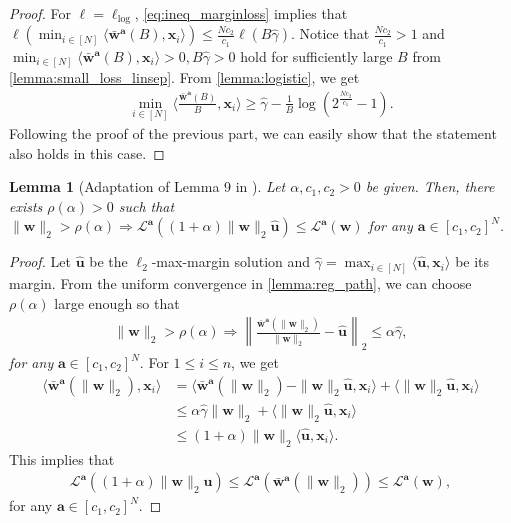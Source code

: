 \documentclass{article} %
\theoremstyle{plain}
\newtheorem{lemma}[theorem]{Lemma}
\theoremstyle{definition}
\theoremstyle{remark}
\def\bignorm#1{\left\lVert#1\right\rVert}
\newcommand{\Ls}{\mathcal{L}}
\def\ba{{\boldsymbol a}}
\def\bu{{\mathbf u}}
\def\bx{{\mathbf x}}
\def\bw{{\mathbf w}}
\begin{document}
\begin{proof}
    For $\ell=\ell_{\text{log}}$, \cref{eq:ineq_marginloss} implies that $\ell(\min_{i\in[N]}\langle \bar{\bw}^\ba(B), \bx_i \rangle) \leq \frac{Nc_2}{c_1}\ell(B\hat{\gamma})$. Notice that $\frac{Nc_2}{c_1}>1$ and $\min_{i\in[N]}\langle \bar{\bw}^\ba(B), \bx_i \rangle>0, B\hat{\gamma} >0$ hold for sufficiently large $B$ from \cref{lemma:small_loss_linsep}. From \cref{lemma:logistic}, we get
    \begin{align*}
        \min_{i \in [N]} \langle \frac{\bar{\bw}^\ba(B)}{B}, \bx_i \rangle \geq \hat{\gamma} - \frac{1}{B}\log (2^\frac{Nc_2}{c_1}-1).
    \end{align*}
    Following the proof of the previous part, we can easily show that the statement also holds in this case.
\end{proof}

\begin{lemma}[Adaptation of Lemma 9 in \citet{ji2020regularization}]\label{lemma:rho}
    Let $\alpha, c_1, c_2>0$ be given. Then, there exists $\rho(\alpha)>0$ such that $\|\bw\|_2 > \rho(\alpha) \Rightarrow \Ls^\ba((1+\alpha)\|\bw\|_2\hat{\bu}) \leq \Ls^\ba(\bw)$ for any $\ba \in [c_1, c_2]^N$.
\end{lemma}
\begin{proof}
    Let $\hat{\bu}$ be the $\ell_2$-max-margin solution and $\hat{\gamma}=\max_{i \in [N]}\langle \hat{\bu}, \bx_i \rangle$ be its margin. From the uniform convergence in \cref{lemma:reg_path}, we can choose $\rho(\alpha)$ large enough so that
    \begin{align*}
        \|\bw\|_2 > \rho(\alpha) \Rightarrow \bignorm{\frac{\bar{\bw}^\ba(\|\bw\|_2)}{\|\bw\|_2} - \hat{\bu}}_2 \leq \alpha \hat{\gamma},
    \end{align*}
    \textit{for any} $\ba \in [c_1, c_2]^N$. For $1 \leq i \leq n$, we get
    \begin{align*}
    \langle \bar{\mathbf{w}}^\ba(\|\mathbf{w}\|_2), \mathbf{x}_i \rangle 
    &= \langle \bar{\mathbf{w}}^\ba(\|\mathbf{w}\|_2) - \|\mathbf{w}\|_2\hat{\mathbf{u}}, \mathbf{x}_i \rangle + \langle \|\mathbf{w}\|_2\hat{\mathbf{u}}, \mathbf{x}_i \rangle \\
    &\le \alpha \hat{\gamma} \|\mathbf{w}\|_2 + \langle \|\mathbf{w}\|_2\hat{\mathbf{u}}, \mathbf{x}_i \rangle \\
    &\le (1 + \alpha) \|\mathbf{w}\|_2 \langle \hat{\mathbf{u}}, \mathbf{x}_i \rangle.
\end{align*}
    This implies that
    \begin{align*}
        \Ls^\ba((1+\alpha)\|\bw\|_2\hat{\bu}) \leq \Ls^\ba(\bar{\bw}^\ba(\|\bw\|_2)) \leq \Ls^\ba(\bw),
    \end{align*}
    for any $\ba \in [c_1, c_2]^N$.
\end{proof}
\end{document}
